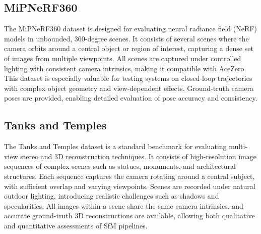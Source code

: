 \subsection{MiPNeRF360}
The MiPNeRF360 dataset \cite{barron2022mipnerf360} is designed for evaluating neural radiance field (NeRF) models in unbounded, 360-degree scenes.
It consists of several scenes where the camera orbits around a central object or region of interest, capturing a dense set of images from multiple viewpoints.
All scenes are captured under controlled lighting with consistent camera intrinsics, making it compatible with AceZero. 
This dataset is especially valuable for testing systems on closed-loop trajectories with complex object geometry and view-dependent effects.
Ground-truth camera poses are provided, enabling detailed evaluation of pose accuracy and consistency.

\subsection{Tanks and Temples}
The Tanks and Temples dataset \cite{Knapitsch2017} is a standard benchmark for evaluating multi-view stereo and 3D reconstruction techniques.
It consists of high-resolution image sequences of complex scenes such as statues, monuments, and architectural structures. 
Each sequence captures the camera rotating around a central subject, with sufficient overlap and varying viewpoints.
Scenes are recorded under natural outdoor lighting, introducing realistic challenges such as shadows and specularities.
All images within a scene share the same camera intrinsics, and accurate ground-truth 3D reconstructions are available, allowing both qualitative and quantitative assessments of SfM pipelines.